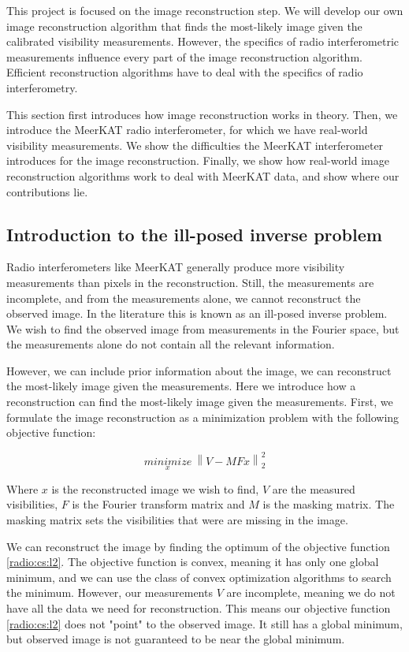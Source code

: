 This project is focused on the image reconstruction step. We will develop our own image reconstruction algorithm that finds the most-likely image given the calibrated visibility measurements. However, the specifics of radio interferometric measurements influence every part of the image reconstruction algorithm. Efficient reconstruction algorithms have to deal with the specifics of radio interferometry. 

This section first introduces how image reconstruction works in theory. Then, we introduce the MeerKAT radio interferometer, for which we have real-world visibility measurements. We show the difficulties the MeerKAT interferometer introduces for the image reconstruction. Finally, we show how real-world image reconstruction algorithms work to deal with MeerKAT data, and show where our contributions lie.


\subsection{Introduction to the ill-posed inverse problem}\label{radio:cs}
Radio interferometers like MeerKAT generally produce more visibility measurements than pixels in the reconstruction. Still, the measurements are incomplete, and from the measurements alone, we cannot reconstruct the observed image. In the literature this is known as an ill-posed inverse problem. We wish to find the observed image from measurements in the Fourier space, but the measurements alone do not contain all the relevant information. 

However, we can include prior information about the image, we can reconstruct the most-likely image given the measurements. Here we introduce how a reconstruction can find the most-likely image given the measurements. First, we formulate the image reconstruction as a minimization problem with the following objective function:

\begin{equation}\label{radio:cs:l2}
\underset{x}{minimize} \: \left \| V - MFx \right \|_2^2
\end{equation}

Where $x$ is the reconstructed image we wish to find, $V$ are the measured visibilities, $F$ is the Fourier transform matrix and $M$ is the masking matrix. The masking matrix sets the visibilities that were are missing in the image. 

We can reconstruct the image by finding the optimum of the objective function \eqref{radio:cs:l2}. The objective function is convex, meaning it has only one global minimum, and we can use the class of convex optimization algorithms to search the minimum. However, our measurements $V$ are incomplete, meaning we do not have all the data we need for reconstruction. This means our objective function \eqref{radio:cs:l2} does not "point" to the observed image. It still has a global minimum, but observed image is not guaranteed to be near the global minimum. 

